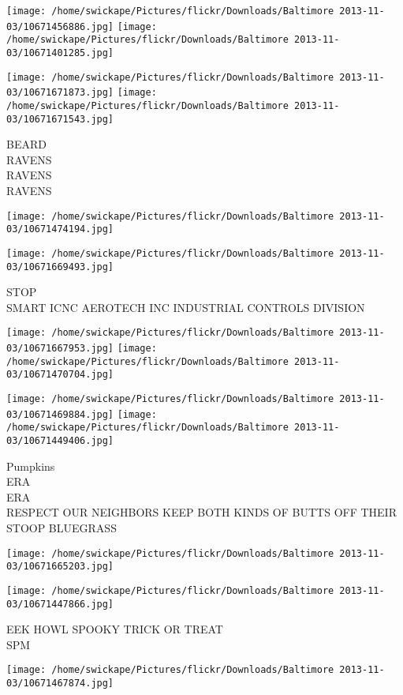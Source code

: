 \documentclass[10pt,letterpaper]{article}
\begin{document}
\texttt{[image: /home/swickape/Pictures/flickr/Downloads/Baltimore 2013-11-03/10671456886.jpg]}
\texttt{[image: /home/swickape/Pictures/flickr/Downloads/Baltimore 2013-11-03/10671401285.jpg]}

\texttt{[image: /home/swickape/Pictures/flickr/Downloads/Baltimore 2013-11-03/10671671873.jpg]}
\texttt{[image: /home/swickape/Pictures/flickr/Downloads/Baltimore 2013-11-03/10671671543.jpg]}

BEARD\\
RAVENS\\
RAVENS\\
RAVENS
\pagebreak

\texttt{[image: /home/swickape/Pictures/flickr/Downloads/Baltimore 2013-11-03/10671474194.jpg]}

\vspace{0.25in}
\texttt{[image: /home/swickape/Pictures/flickr/Downloads/Baltimore 2013-11-03/10671669493.jpg]}

STOP\\
SMART ICNC AEROTECH INC INDUSTRIAL CONTROLS DIVISION
\pagebreak

\texttt{[image: /home/swickape/Pictures/flickr/Downloads/Baltimore 2013-11-03/10671667953.jpg]}
\texttt{[image: /home/swickape/Pictures/flickr/Downloads/Baltimore 2013-11-03/10671470704.jpg]}

\texttt{[image: /home/swickape/Pictures/flickr/Downloads/Baltimore 2013-11-03/10671469884.jpg]}
\texttt{[image: /home/swickape/Pictures/flickr/Downloads/Baltimore 2013-11-03/10671449406.jpg]}

Pumpkins\\
ERA\\
ERA\\
RESPECT OUR NEIGHBORS KEEP BOTH KINDS OF BUTTS OFF THEIR STOOP BLUEGRASS
\pagebreak

\texttt{[image: /home/swickape/Pictures/flickr/Downloads/Baltimore 2013-11-03/10671665203.jpg]}

\vspace{0.25in}
\texttt{[image: /home/swickape/Pictures/flickr/Downloads/Baltimore 2013-11-03/10671447866.jpg]}

EEK HOWL SPOOKY TRICK OR TREAT\\
SPM
\pagebreak

\texttt{[image: /home/swickape/Pictures/flickr/Downloads/Baltimore 2013-11-03/10671467874.jpg]}
\end{document}
